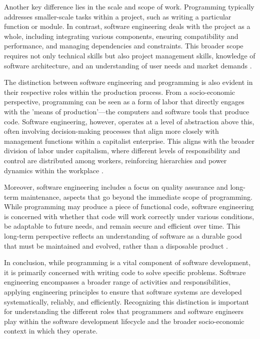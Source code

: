 \begin{refsection}
Another key difference lies in the scale and scope of work. Programming typically addresses smaller-scale tasks within a project, such as writing a particular function or module. In contrast, software engineering deals with the project as a whole, including integrating various components, ensuring compatibility and performance, and managing dependencies and constraints. This broader scope requires not only technical skills but also project management skills, knowledge of software architecture, and an understanding of user needs and market demands \cite[pp.~55-58]{freeman2014head}.

The distinction between software engineering and programming is also evident in their respective roles within the production process. From a socio-economic perspective, programming can be seen as a form of labor that directly engages with the 'means of production'—the computers and software tools that produce code. Software engineering, however, operates at a level of abstraction above this, often involving decision-making processes that align more closely with management functions within a capitalist enterprise. This aligns with the broader division of labor under capitalism, where different levels of responsibility and control are distributed among workers, reinforcing hierarchies and power dynamics within the workplace \cite[pp.~104-110]{braverman1974labor}.

Moreover, software engineering includes a focus on quality assurance and long-term maintenance, aspects that go beyond the immediate scope of programming. While programming may produce a piece of functional code, software engineering is concerned with whether that code will work correctly under various conditions, be adaptable to future needs, and remain secure and efficient over time. This long-term perspective reflects an understanding of software as a durable good that must be maintained and evolved, rather than a disposable product \cite[pp.~32-35]{mcconnell2007code}.

In conclusion, while programming is a vital component of software development, it is primarily concerned with writing code to solve specific problems. Software engineering encompasses a broader range of activities and responsibilities, applying engineering principles to ensure that software systems are developed systematically, reliably, and efficiently. Recognizing this distinction is important for understanding the different roles that programmers and software engineers play within the software development lifecycle and the broader socio-economic context in which they operate.


\end{refsection}
